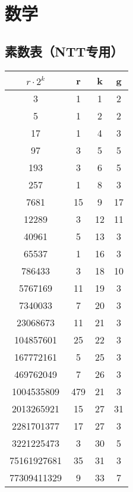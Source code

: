 \section{数学}

\subsection{素数表（NTT专用）}

\begin{table}[htbp]
  \vspace{1cm}
  \centering
  \begin{tabular}{ c | c | c | c }
    \hline
        {\bf $r \cdot 2^k$} & {\bf r} & {\bf k} & {\bf g}\\
        
        \hline

        3	& 1	& 1	& 2 \\
        \hline
        5	& 1	& 2	& 2 \\
        \hline
        17	&	1	& 4	&3 \\
        \hline
        97	&	3	&	5	&5 \\
        \hline
        193	&	3	&	6	&5 \\
        \hline
        257	&	1	&	8	&3 \\
        \hline
        7681	&	15	&	9	&17 \\
        \hline
        12289	&	3	&	12	&11 \\
        \hline
        40961	&	5	&	13	&3 \\
        \hline
        65537	&	1	&	16	&3 \\
        \hline
        786433	&	3	&	18	&10 \\
        \hline
        5767169	&	11	&	19	&3 \\
        \hline
        7340033	&	7	&	20	&3 \\
        \hline
        23068673	&	11	&21	&3 \\
        \hline
        104857601	&	25	&22	&3 \\
        \hline
        167772161	&	5	&25	&3 \\
        \hline
        469762049	&	7	&26	&3 \\
        \hline
        1004535809	&	479	&21	&3 \\
        \hline
        2013265921	&	15	&27	&31 \\
        \hline
        2281701377	&	17	&27	&3 \\
        \hline
        3221225473	&	3	&30	&5 \\
        \hline
        75161927681	&	35	&31	&3 \\
        \hline
        77309411329	&	9	&33	&7 \\
        \hline
  \end{tabular}
\end{table}
